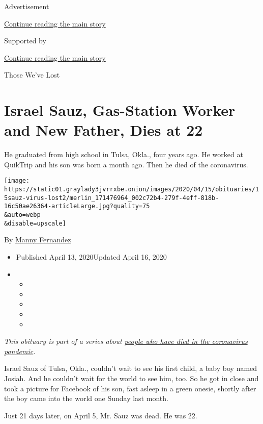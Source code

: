 Advertisement

\protect\hyperlink{after-top}{Continue reading the main story}

Supported by

\protect\hyperlink{after-sponsor}{Continue reading the main story}

Those We've Lost

\hypertarget{israel-sauz-gas-station-worker-and-new-father-dies-at-22}{%
\section{Israel Sauz, Gas-Station Worker and New Father, Dies at
22}\label{israel-sauz-gas-station-worker-and-new-father-dies-at-22}}

He graduated from high school in Tulsa, Okla., four years ago. He worked
at QuikTrip and his son was born a month ago. Then he died of the
coronavirus.

\texttt{[image: https://static01.graylady3jvrrxbe.onion/images/2020/04/15/obituaries/15sauz-virus-lost2/merlin\_171476964\_002c72b4-279f-4eff-818b-16c50ae26364-articleLarge.jpg?quality=75\\\&auto=webp\\\&disable=upscale]}

By \href{https://www.nytimes3xbfgragh.onion/by/manny-fernandez}{Manny
Fernandez}

\begin{itemize}
\item
  Published April 13, 2020Updated April 16, 2020
\item
  \begin{itemize}
  \item
  \item
  \item
  \item
  \item
  \end{itemize}
\end{itemize}

\emph{This obituary is part of a series about}
\href{https://www.nytimes3xbfgragh.onion/series/people-who-have-died-of-the-coronavirus}{\emph{people
who have died in the coronavirus pandemic}}\emph{.}

Israel Sauz of Tulsa, Okla., couldn't wait to see his first child, a
baby boy named Josiah. And he couldn't wait for the world to see him,
too. So he got in close and took a picture for Facebook of his son, fast
asleep in a green onesie, shortly after the boy came into the world one
Sunday last month.

Just 21 days later, on April 5, Mr. Sauz was dead. He was 22.

